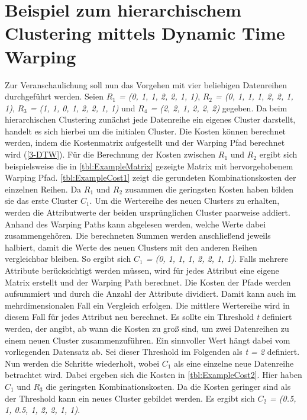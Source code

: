 \section{Beispiel zum hierarchischem Clustering mittels Dynamic Time Warping}
\label{3-Example}
Zur Veranschaulichung soll nun das Vorgehen mit vier beliebigen Datenreihen durchgeführt werden.
Seien \emph{$R_{1}$ = (0, 1, 1, 2, 2, 1, 1)}, \emph{$R_{2}$ = (0, 1, 1, 1, 2, 2, 1, 1)},
\emph{$R_{3}$ = (1, 1, 0, 1, 2, 2, 1, 1)} und \emph{$R_{4}$ = (2, 2, 1, 2, 2, 2)} gegeben.
Da beim hierarchischen Clustering zunächst jede Datenreihe ein eigenes Cluster darstellt,
handelt es sich hierbei um die initialen Cluster.
Die Kosten können berechnet werden, indem die Kostenmatrix aufgestellt und der Warping Pfad berechnet wird (\autoref{3-DTW}).
Für die Berechnung der Kosten zwischen \emph{$R_{1}$} und \emph{$R_{2}$} ergibt sich beispielsweise
die in \autoref{tbl:ExampleMatrix} gezeigte Matrix
mit hervorgehobenem Warping Pfad.
\autoref{tbl:ExampleCost1} zeigt die gerundeten Kombinationskosten der einzelnen Reihen.
Da \emph{$R_{1}$} und \emph{$R_{2}$} zusammen die geringsten Kosten haben bilden sie das erste Cluster \emph{$C_{1}$}.
Um die Wertereihe des neuen Clusters zu erhalten, werden die Attributwerte der beiden ursprünglichen Cluster paarweise addiert.
Anhand des Warping Paths kann abgelesen werden, welche Werte dabei zusammengehören.
Die berechneten Summen werden anschließend jeweils halbiert, damit die Werte des neuen Clusters mit den anderen Reihen vergleichbar bleiben.
So ergibt sich \emph{$C_{1}$ = (0, 1, 1, 1, 2, 2, 1, 1)}.
Falls mehrere Attribute berücksichtigt werden müssen,
wird für jedes Attribut eine eigene Matrix erstellt und der Warping Path berechnet.
Die Kosten der Pfade werden aufsummiert und durch die Anzahl der Attribute dividiert.
Damit kann auch im mehrdimensionalen Fall ein Vergleich erfolgen.
Die mittlere Wertereihe wird in diesem Fall für jedes Attribut neu berechnet.
Es sollte ein Threshold \emph{t} definiert werden,
der angibt, ab wann die Kosten zu groß sind, um zwei Datenreihen zu einem neuen Cluster zusammenzuführen.
Ein sinnvoller Wert hängt dabei vom vorliegenden Datensatz ab.
Sei dieser Threshold im Folgenden als \emph{t = 2} definiert.
Nun werden die Schritte wiederholt, wobei \emph{$C_{1}$} als eine einzelne neue Datenreihe betrachtet wird.
Dabei ergeben sich die Kosten in \autoref{tbl:ExampleCost2}.
Hier haben \emph{$C_{1}$} und \emph{$R_{3}$} die geringsten Kombinationskosten.
Da die Kosten geringer sind als der Threshold kann ein neues Cluster gebildet werden.
Es ergibt sich \emph{$C_{2}$ = (0.5, 1, 0.5, 1, 2, 2, 1, 1)}.
